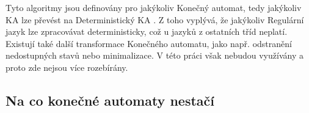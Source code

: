 \vspace{0.5cm}

Tyto algoritmy jsou definovány pro jakýkoliv Konečný automat, tedy jakýkoliv KA
lze převést na Deterministický KA \cite[str. 39]{MedunaIFJ}.
Z toho vyplývá, že jakýkoliv Regulární jazyk lze zpracovávat deterministicky,
což u jazyků z ostatních tříd  neplatí.\\

Existují také další transformace Konečného automatu, jako např.
odstranění nedostupných stavů nebo minimalizace. V této práci však
nebudou využívány a proto zde nejsou více rozebírány.\\

\subsection*{Na co konečné automaty nestačí}

